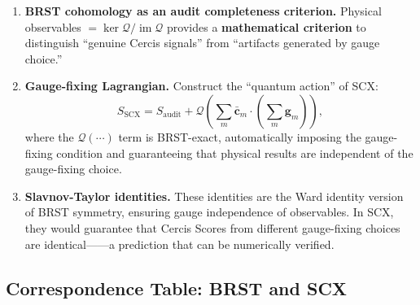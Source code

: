 \documentclass[12pt,a4paper]{article}
\theoremstyle{remark}
\newcommand{\gaugeparam}{\mathbf{g}}
\begin{document}
\begin{enumerate}[label=\textbf{(B\arabic*)}]
    Note: this construction is \textbf{formal}——it defines the mathematical structure of BRST-type cohomology in SCX,
    but its physical realization requires verifying that the Grassmann nature of $\mathbf{c}_m$ can actually be endowed within SCX's computational framework.

    \item \textbf{BRST cohomology as an audit completeness criterion.}
    Physical observables $= \ker\mathcal{Q} / \operatorname{im}\mathcal{Q}$ provides a
    \textbf{mathematical criterion} to distinguish ``genuine Cercis signals'' from ``artifacts generated by gauge choice.''

    \item \textbf{Gauge-fixing Lagrangian.} Construct the ``quantum action'' of SCX:
    \begin{equation}
        S_{\text{SCX}} = S_{\text{audit}} + \mathcal{Q}\left(\sum_m \bar{\mathbf{c}}_m
        \cdot (\sum_m \gaugeparam_m)\right),
    \end{equation}
    where the $\mathcal{Q}(\cdots)$ term is BRST-exact, automatically imposing the gauge-fixing condition and guaranteeing that physical results are independent of the gauge-fixing choice.

    \item \textbf{Slavnov-Taylor identities.} These identities are the Ward identity version of BRST symmetry,
    ensuring gauge independence of observables. In SCX, they would guarantee that Cercis Scores from different gauge-fixing choices
    are identical——a prediction that can be numerically verified.
\end{enumerate}

\subsection{Correspondence Table: BRST and SCX}
\end{document}
